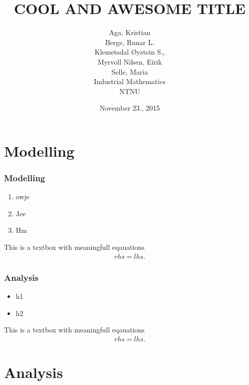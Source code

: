 \documentclass[screen]{beamer}
\title[Eksempelforedrag]%
{COOL AND AWESOME TITLE}
\author[aut]{Aga, Kristian \\ Berge, Runar L. \\ Klemetsdal Øystein S.,\\
	Myrvoll Nilsen, Eirik \\ Selle, Maria\\
	Industrial Mathematics\\
	NTNU
}
\institute[NTNU]{Institutt for matematiske fag}
\date{November 23., 2015}
\begin{document}
\ntnutitlepage

\section*{Modelling}
\begin{frame}
    \frametitle{Modelling}
    \begin{enumerate}[\label = $\circ$]
        \item    owje
        \item    Jee
        \item    Hm
    \end{enumerate}
    \begin{block}{This is a textbox with meaningfull eqauations}
        \begin{align*}
            rhs = lhs.
        \end{align*}
    \end{block}
\end{frame}

\begin{frame}
    \frametitle{Analysis}
    \begin{itemize}
        \pause
        \item    h1
        \pause
        \item    h2    
    \end{itemize}
    \pause
    \begin{block}{This is a textbox with meaningfull eqauations}
        \begin{align*}
            rhs = lhs.
        \end{align*}
    \end{block}
\end{frame}

\section*{Analysis}

\section*{}

\begin{frame}
    
\end{frame}
\end{document}
